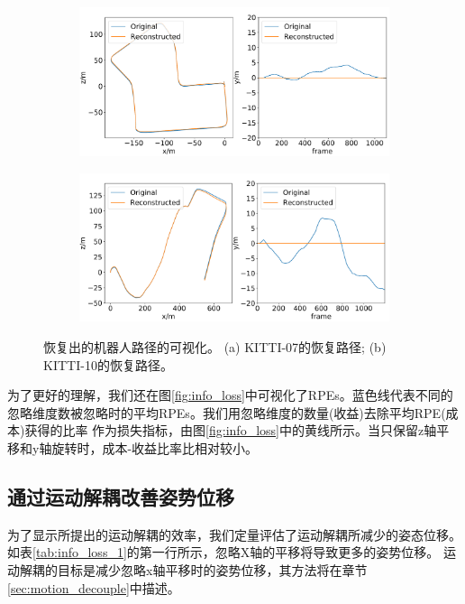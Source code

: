 \begin{figure}[ht]
    \centering
    \begin{subfigure}[b]{0.47\textwidth}
    \includegraphics[width=\textwidth]{datavo/path_recon_07.pdf}
    \caption{}
    \label{fig:recon_07}
    \end{subfigure}
    \begin{subfigure}[b]{0.47\textwidth}
        \includegraphics[width=\textwidth]{datavo/path_recon_10.pdf}
        \caption{}
        \label{fig:recon_10}
    \end{subfigure}
    \caption{恢复出的机器人路径的可视化。 (a) KITTI-07的恢复路径; (b) KITTI-10的恢复路径。} 
    \label{fig:path_recon}
\end{figure}
为了更好的理解，我们还在图\ref{fig:info_loss}中可视化了RPEs。蓝色线代表不同的忽略维度数被忽略时的平均{RPEs}。我们用忽略维度的数量(收益)去除平均RPE(成本)获得的比率
作为损失指标，由图\ref{fig:info_loss}中的黄线所示。当只保留z轴平移和y轴旋转时，成本-收益比率比相对较小。

\subsection{通过运动解耦改善姿势位移}
\label{sec:info_decouple}
为了显示所提出的运动解耦的效率，我们定量评估了运动解耦所减少的姿态位移。如表\ref{tab:info_loss_1}的第一行所示，忽略X轴的平移将导致更多的姿势位移。%
运动解耦的目标是减少忽略x轴平移时的姿势位移，其方法将在章节\ref{sec:motion_decouple}中描述。

